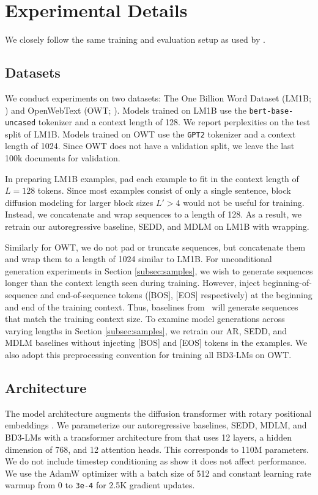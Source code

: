 \documentclass{article} %
\def\algos{BD3-LMs}
\begin{document}
\section{Experimental Details}
\label{suppl:details}
We closely follow the same training and evaluation setup as used by \citet{sahoo2024simple}. 

\subsection{Datasets}
\label{suppl:datasets}
We conduct experiments on two datasets: The One Billion Word Dataset (LM1B; \citet{chelba2014billion}) and OpenWebText (OWT; \citet{Gokaslan2019OpenWeb}). Models trained on LM1B use the \texttt{bert-base-uncased} tokenizer and a context length of 128. We report perplexities on the test split of LM1B. Models trained on OWT use the \texttt{GPT2} tokenizer \citet{radford2019language} and a context length of 1024. Since OWT does not have a validation split, we leave the last 100k documents for validation.

In preparing LM1B examples, \citet{sahoo2024simple} pad each example to fit in the context length of $L=128$ tokens. Since most examples consist of only a single sentence, block diffusion modeling for larger block sizes $L'>4$ would not be useful for training. Instead, we concatenate and wrap sequences to a length of 128. As a result, we retrain our autoregressive baseline, SEDD, and MDLM on LM1B with wrapping. 

Similarly for OWT, we do not pad or truncate sequences, but concatenate them and wrap them to a length of 1024 similar to LM1B. For unconditional generation experiments in Section \ref{subsec:samples}, we wish to generate sequences longer than the context length seen during training. However, \citet{sahoo2024simple} inject beginning-of-sequence and end-of-sequence tokens ([BOS], [EOS] respectively) at the beginning and end of the training context. Thus, baselines from~\citet{sahoo2024simple} will generate sequences that match the training context size. To examine model generations across varying lengths in Section \ref{subsec:samples}, we retrain our AR, SEDD, and MDLM baselines without injecting [BOS] and [EOS] tokens in the examples. We also adopt this preprocessing convention for training all \algos{} on OWT.

\subsection{Architecture}
\label{suppl:arch}
The model architecture augments the diffusion transformer \citep{peebles2023scalable} with rotary positional embeddings \citep{su2021roformer}. We parameterize our autoregressive baselines, SEDD, MDLM, and \algos{} with a transformer architecture from \citet{sahoo2024simple} that uses 12 layers, a hidden dimension of 768, and 12 attention heads. This corresponds to 110M parameters. We do not include timestep conditioning as \citet{sahoo2024simple} show it does not affect performance. We use the AdamW optimizer with a batch size of 512 and constant learning rate warmup from 0 to \texttt{3e-4} for 2.5K gradient updates.
\end{document}
